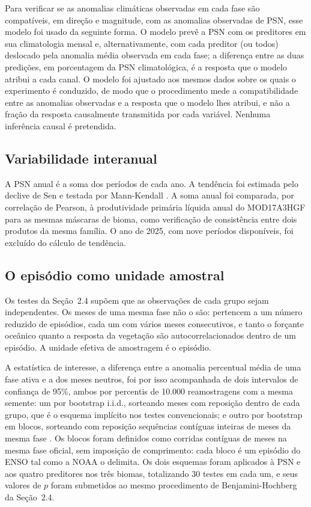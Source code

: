 \documentclass[a4paper,fleqn]{cas-sc}
\begin{document}
Para verificar se as anomalias climáticas observadas em cada fase são compatíveis, em direção e magnitude, com as anomalias observadas de PSN, esse modelo foi usado da seguinte forma. O modelo prevê a PSN com os preditores em sua climatologia mensal e, alternativamente, com cada preditor (ou todos) deslocado pela anomalia média observada em cada fase; a diferença entre as duas predições, em porcentagem da PSN climatológica, é a resposta que o modelo atribui a cada canal. O modelo foi ajustado aos mesmos dados sobre os quais o experimento é conduzido, de modo que o procedimento mede a compatibilidade entre as anomalias observadas e a resposta que o modelo lhes atribui, e não a fração da resposta causalmente transmitida por cada variável. Nenhuma inferência causal é pretendida.

\subsection{Variabilidade interanual}

A PSN anual é a soma dos períodos de cada ano. A tendência foi estimada pelo declive de Sen \citep{sen1968} e testada por Mann-Kendall \citep{mann1945}. A soma anual foi comparada, por correlação de Pearson, à produtividade primária líquida anual do MOD17A3HGF para as mesmas máscaras de bioma, como verificação de consistência entre dois produtos da mesma família. O ano de 2025, com nove períodos disponíveis, foi excluído do cálculo de tendência.

\subsection{O episódio como unidade amostral}

Os testes da Seção~2.4 supõem que as observações de cada grupo sejam independentes. Os meses de uma mesma fase não o são: pertencem a um número reduzido de episódios, cada um com vários meses consecutivos, e tanto o forçante oceânico quanto a resposta da vegetação são autocorrelacionados dentro de um episódio. A unidade efetiva de amostragem é o episódio.

A estatística de interesse, a diferença entre a anomalia percentual média de uma fase ativa e a dos meses neutros, foi por isso acompanhada de dois intervalos de confiança de 95\%, ambos por percentis de 10.000 reamostragens com a mesma semente: um por bootstrap i.i.d., sorteando meses com reposição dentro de cada grupo, que é o esquema implícito nos testes convencionais; e outro por bootstrap em blocos, sorteando com reposição sequências contíguas inteiras de meses da mesma fase \citep{kunsch1989, politis1994}. Os blocos foram definidos como corridas contíguas de meses na mesma fase oficial, sem imposição de comprimento: cada bloco é um episódio do ENSO tal como a NOAA o delimita. Os dois esquemas foram aplicados à PSN e aos quatro preditores nos três biomas, totalizando 30 testes em cada um, e seus valores de $p$ foram submetidos ao mesmo procedimento de Benjamini-Hochberg da Seção~2.4.
\end{document}

